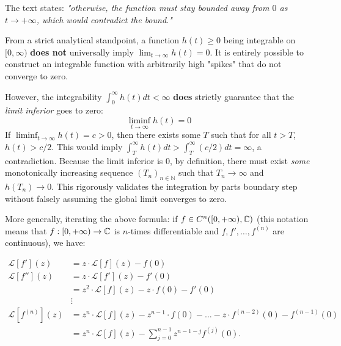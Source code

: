 \begin{verification}
    The text states: \textit{"otherwise, the function must stay bounded away from $0$ as $t \to +\infty$, which would contradict the bound."}
    
    From a strict analytical standpoint, a function $h(t) \ge 0$ being integrable on $[0, \infty)$ \textbf{does not} universally imply $\lim_{t \to \infty} h(t) = 0$. It is entirely possible to construct an integrable function with arbitrarily high "spikes" that do not converge to zero. 
    
    However, the integrability $\int_0^\infty h(t) dt < \infty$ \textbf{does} strictly guarantee that the \textit{limit inferior} goes to zero:
    \[ \liminf_{t \to \infty} h(t) = 0 \]
    If $\liminf_{t \to \infty} h(t) = c > 0$, then there exists some $T$ such that for all $t > T$, $h(t) > c/2$. This would imply $\int_T^\infty h(t)dt > \int_T^\infty (c/2) dt = \infty$, a contradiction. Because the limit inferior is $0$, by definition, there must exist \textit{some} monotonically increasing sequence $(T_n)_{n \in \mathbb{N}}$ such that $T_n \to \infty$ and $h(T_n) \to 0$. This rigorously validates the integration by parts boundary step without falsely assuming the global limit converges to zero.
\end{verification}

More generally, iterating the above formula: if $f \in C^n([0, +\infty), \mathbb{C})$ (this notation means that $f: [0, +\infty) \to \mathbb{C}$ is $n$-times differentiable and $f, f', \dots, f^{(n)}$ are continuous), we have:

\begin{align*}
    \mathcal{L}[f'](z) &= z \cdot \mathcal{L}[f](z) - f(0) \\
    \mathcal{L}[f''](z) &= z \cdot \mathcal{L}[f'](z) - f'(0) \\
    &= z^2 \cdot \mathcal{L}[f](z) - z \cdot f(0) - f'(0) \\
    &\vdots \\
    \mathcal{L}[f^{(n)}](z) &= z^n \cdot \mathcal{L}[f](z) - z^{n-1} \cdot f(0) - \dots - z \cdot f^{(n-2)}(0) - f^{(n-1)}(0) \tag{**} \\
    &= z^n \cdot \mathcal{L}[f](z) - \sum_{j=0}^{n-1} z^{n-1-j} f^{(j)}(0).
\end{align*}
